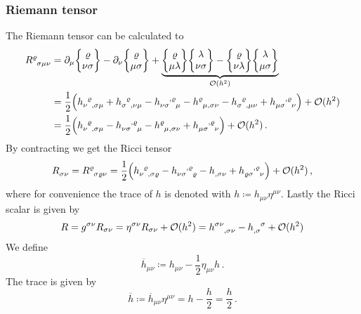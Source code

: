 \subsubsection*{Riemann tensor}
The Riemann tensor can be calculated to
\begin{equation}
    \begin{split}
        \tensor{R}{^\varrho_\sigma_\mu_\nu}
        &= \partial_\mu \cSym{\varrho}{\nu}{\sigma} - \partial_\nu \cSym{\varrho}{\mu}{\sigma}
        + \underbrace{\cSym{\varrho}{\mu}{\lambda} \cSym{\lambda}{\nu}{\sigma} - \cSym{\varrho}{\nu}{\lambda} \cSym{\lambda}{\mu}{\sigma}}_{\landauO(h^2)} \\
        &= \frac{1}{2} \left( \tensor{h}{_\nu^\varrho_,_\sigma_\mu} +
        {\tensor{h}{_\sigma^\varrho_,_\nu_\mu}} - \tensor{h}{_\nu_\sigma^,^\varrho_\mu} - \tensor{h}{^\varrho_\mu_,_\sigma_\nu} -
        {\tensor{h}{_\sigma^\varrho_,_\mu_\nu}} +
        \tensor{h}{_\mu_\sigma^,^\varrho_\nu} \right) + \landauO(h^2) \\
        &= \frac{1}{2} \left( \tensor{h}{_\nu^\varrho_,_\sigma_\mu} - \tensor{h}{_\nu_\sigma^,^\varrho_\mu}
        - \tensor{h}{^\varrho_\mu_,_\sigma_\nu} +
        \tensor{h}{_\mu_\sigma^,^\varrho_\nu} \right) + \landauO(h^2) \, .
    \end{split}
\end{equation}
By contracting we get the Ricci tensor
\begin{equation}
    \tensor{R}{_\sigma_\nu} = \tensor{R}{^\varrho_\sigma_\varrho_\nu}
    = \frac{1}{2} \left( \tensor{h}{_\nu^\varrho_,_\sigma_\varrho} - \tensor{h}{_\nu_\sigma^,^\varrho_\varrho}
    - \tensor{h}{_,_\sigma_\nu} + \tensor{h}{_\varrho_\sigma^,^\varrho_\nu} \right) + \landauO(h^2)\, ,
\end{equation}
where for convenience the trace of $h$ is denoted with $h\coloneqq
h_{\mu\nu}\eta^{\mu\nu}$. Lastly the Ricci scalar is given by
\begin{equation}
    R = g^{\sigma\nu}R_{\sigma\nu} = \eta^{\sigma\nu}R_{\sigma\nu} + \landauO(h^2)
    = \tensor{h}{^\sigma^\nu_,_\sigma_\nu} - \tensor{h}{_,_\sigma^\sigma} + \landauO(h^2)
\end{equation}
We define
\begin{equation}
    \overline{h}_{\mu\nu} \coloneqq h_{\mu\nu} - \frac{1}{2} \eta_{\mu\nu}h\,.
\end{equation}
The trace is given by
\begin{equation}
    \overline{h} \coloneqq  \overline{h}_{\mu\nu}\eta^{\mu\nu} = h -   
    \frac{h}{2} = \frac{h}{2}\,.
\end{equation}
